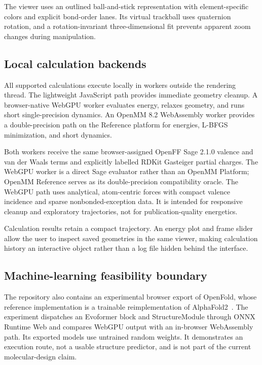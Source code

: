 \documentclass[11pt]{article}
\begin{document}
The viewer uses an outlined ball-and-stick representation with element-specific
colors and explicit bond-order lanes.
Its virtual trackball uses quaternion rotation, and a rotation-invariant
three-dimensional fit prevents apparent zoom changes during manipulation.

\subsection{Local calculation backends}

All supported calculations execute locally in workers outside the rendering
thread.
The lightweight JavaScript path provides immediate geometry cleanup.
A browser-native WebGPU worker evaluates energy, relaxes geometry, and runs short
single-precision dynamics.
An OpenMM 8.2 WebAssembly worker provides a double-precision path on the
Reference platform for energies, L-BFGS minimization, and short dynamics.

Both workers receive the same browser-assigned OpenFF Sage 2.1.0 valence and
van der Waals terms and explicitly labelled RDKit Gasteiger partial charges.
The WebGPU worker is a direct Sage evaluator rather than an OpenMM Platform;
OpenMM Reference serves as its double-precision compatibility oracle.
The WebGPU path uses analytical, atom-centric forces with compact valence
incidence and sparse nonbonded-exception data.
It is intended for responsive cleanup and exploratory trajectories, not for
publication-quality energetics.

Calculation results retain a compact trajectory.
An energy plot and frame slider allow the user to inspect saved geometries in the
same viewer, making calculation history an interactive object rather than a log
file hidden behind the interface.

\subsection{Machine-learning feasibility boundary}

The repository also contains an experimental browser export of OpenFold, whose
reference implementation is a trainable reimplementation of
AlphaFold2~\cite{ahdritz2024openfold}.
The experiment dispatches an Evoformer block and StructureModule through ONNX
Runtime Web and compares WebGPU output with an in-browser WebAssembly path.
Its exported models use untrained random weights.
It demonstrates an execution route, not a usable structure predictor, and is not
part of the current molecular-design claim.
\end{document}
